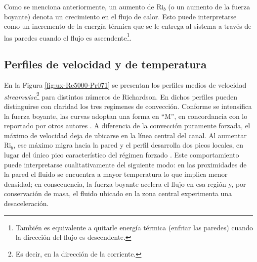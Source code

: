 Como se menciona anteriormente, un aumento de Ri$_b$ (o un aumento de la fuerza boyante) denota un crecimiento en el flujo de calor. Esto puede interpretarse como un incremento de la energía térmica que se le entrega al sistema a través de las paredes cuando el flujo es ascendente\footnote{También es equivalente a quitarle energía térmica (enfriar las paredes) cuando la dirección del flujo es descendente.}.

\subsection{Perfiles de velocidad y de temperatura} \label{sec:velo_temp}

En la Figura \ref{fig:ux-Re5000-Pr071} se presentan los perfiles medios de velocidad  \textit{streamwise}\footnote{Es decir, en la dirección de la corriente.} para distintos números de Richardson. En dichos perfiles pueden distinguirse con claridad los tres regímenes de convección. Conforme se intensifica la fuerza boyante, las curvas adoptan una forma en ``M'', en concordancia con lo reportado por otros autores \cite{you2003direct, zhou2024direct}. A diferencia de la convección puramente forzada, el máximo de velocidad deja de ubicarse en la línea central del canal. Al aumentar $\mathrm{Ri}_b$, ese máximo migra hacia la pared y el perfil desarrolla dos picos locales, en lugar del único pico característico del régimen forzado \cite{carr1973velocity,steiner1971reverse,zhou2024direct}. Este comportamiento puede interpretarse cualitativamente del siguiente modo: en las proximidades de la pared el fluido se encuentra a mayor temperatura lo que implica menor densidad; en consecuencia, la fuerza boyante acelera el flujo en esa región y, por conservación de masa, el fluido ubicado en la zona central experimenta una desaceleración.



